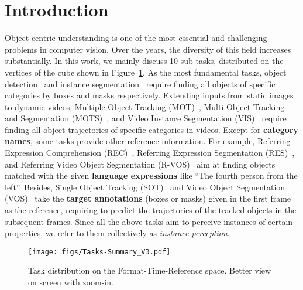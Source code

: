 \documentclass[10pt,twocolumn,letterpaper]{article}
\begin{document}
\section{Introduction}
\label{sec:intro}




Object-centric understanding is one of the most essential and challenging problems in computer vision. Over the years, the diversity of this field increases substantially. In this work, we mainly discuss 10 sub-tasks, distributed on the vertices of the cube shown in Figure~\ref{fig-tasks}. As the most fundamental tasks, object detection~\cite{DPM,FasterRCNN,FPN,YOLO,FCOS,CascadeRCNN, DETR} and instance segmentation~\cite{MaskRCNN,SOLO,PANet,YOLACT,CondInst} require finding all objects of specific categories by boxes and masks respectively. Extending inputs from static images to dynamic videos, Multiple Object Tracking (MOT)~\cite{MOT17,Tracktor,CenterTrack,FairMOT}, Multi-Object Tracking and Segmentation (MOTS)~\cite{MOTS,PointTrackV2,PCAN}, and Video Instance Segmentation (VIS)~\cite{VIS, VISTR, SeqFormer,IFC} require finding all object trajectories of specific categories in videos. Except for \textbf{category names}, some tasks provide other reference information. For example, Referring Expression Comprehension (REC)~\cite{RefCOCO&plus,FAOA,SeqTR}, Referring Expression Segmentation (RES)~\cite{RefCOCO&plus,CMSA,LAVT}, and Referring Video Object Segmentation (R-VOS)~\cite{URVOS,MTTR,ReferFormer} aim at finding objects matched with the given \textbf{language expressions} like ``The fourth person from the left''. Besides, Single Object Tracking (SOT)~\cite{OTB2015,SiameseFC,SiameseRPN} and Video Object Segmentation (VOS)~\cite{YoutubeVOS,STM,STCN} take the \textbf{target annotations} (boxes or masks) given in the first frame as the reference, requiring to predict the trajectories of the tracked objects in the subsequent frames. Since all the above tasks aim to perceive instances of certain properties, we refer to them collectively as \textit{instance perception}.



\begin{figure}[!t]
  \begin{center}
\texttt{[image: figs/Tasks-Summary\_V3.pdf]}
  \end{center}
  \vspace{-5mm}
\caption{Task distribution on the Format-Time-Reference space. Better view on screen with zoom-in.} \label{fig-tasks}
\vspace{-3mm}
\end{figure}
\end{document}
